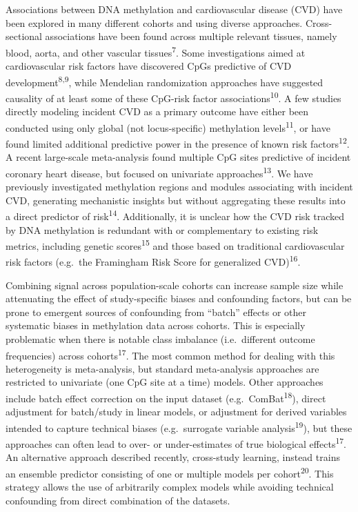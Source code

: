 \documentclass[]{article}
\begin{document}
Associations between DNA methylation and cardiovascular disease (CVD)
have been explored in many different cohorts and using diverse
approaches. Cross-sectional associations have been found across multiple
relevant tissues, namely blood, aorta, and other vascular
tissues\textsuperscript{7}. Some investigations aimed at cardiovascular
risk factors have discovered CpGs predictive of CVD
development\textsuperscript{8,9}, while Mendelian randomization
approaches have suggested causality of at least some of these CpG-risk
factor associations\textsuperscript{10}. A few studies directly modeling
incident CVD as a primary outcome have either been conducted using only
global (not locus-specific) methylation levels\textsuperscript{11}, or
have found limited additional predictive power in the presence of known
risk factors\textsuperscript{12}. A recent large-scale meta-analysis
found multiple CpG sites predictive of incident coronary heart disease,
but focused on univariate approaches\textsuperscript{13}. We have
previously investigated methylation regions and modules associating with
incident CVD, generating mechanistic insights but without aggregating
these results into a direct predictor of risk\textsuperscript{14}.
Additionally, it is unclear how the CVD risk tracked by DNA methylation
is redundant with or complementary to existing risk metrics, including
genetic scores\textsuperscript{15} and those based on traditional
cardiovascular risk factors (e.g.~the Framingham Risk Score for
generalized CVD)\textsuperscript{16}.

Combining signal across population-scale cohorts can increase sample
size while attenuating the effect of study-specific biases and
confounding factors, but can be prone to emergent sources of confounding
from ``batch'' effects or other systematic biases in methylation data
across cohorts. This is especially problematic when there is notable
class imbalance (i.e.~different outcome frequencies) across
cohorts\textsuperscript{17}. The most common method for dealing with
this heterogeneity is meta-analysis, but standard meta-analysis
approaches are restricted to univariate (one CpG site at a time) models.
Other approaches include batch effect correction on the input dataset
(e.g.~ComBat\textsuperscript{18}), direct adjustment for batch/study in
linear models, or adjustment for derived variables intended to capture
technical biases (e.g.~surrogate variable analysis\textsuperscript{19}),
but these approaches can often lead to over- or under-estimates of true
biological effects\textsuperscript{17}. An alternative approach
described recently, cross-study learning, instead trains an ensemble
predictor consisting of one or multiple models per
cohort\textsuperscript{20}. This strategy allows the use of arbitrarily
complex models while avoiding technical confounding from direct
combination of the datasets.
\end{document}
